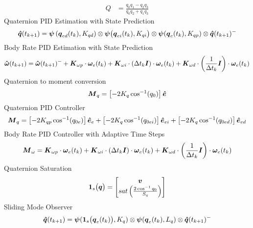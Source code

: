 \begin{nomenclature}
\begin{equation}
\begin{aligned}
    Q &= \frac{q_{0}q_{1} - q_{2}q_{3}}{q_{0}q_{2} + q_{1}q_{3}}
  \end{aligned}
\end{equation}
Quaternion PID Estimation with State Prediction
\begin{equation}
  \boldsymbol{\hat{q}}(t_{k+1}) = \boldsymbol{\psi}\left(\boldsymbol{q}_{ed}(t_k), K_{qd}\right) \otimes \boldsymbol{\psi}\big(\boldsymbol{q}_{ei}(t_k), K_{qi}\big) \otimes \boldsymbol{\psi}(\boldsymbol{q}_e(t_{k}), K_{qp})  \otimes \boldsymbol{\hat{q}}(t_{k+1})^-
\end{equation}
Body Rate PID Estimation with State Prediction
\begin{equation}
  \boldsymbol{\hat{\omega}}(t_{k+1}) = \boldsymbol{\hat{\omega}}(t_{k+1})^- + \boldsymbol{K}_{\omega p} \cdot \boldsymbol{\omega}_e(t_{k}) + \boldsymbol{K}_{\omega i} \cdot (\Delta t_k \boldsymbol{I})\cdot \boldsymbol{\omega}_e(t_{k}) + \boldsymbol{K}_{\omega d} \cdot \left(\frac{1}{\Delta t_k} \boldsymbol{I}\right) \cdot \boldsymbol{\omega}_e(t_{k})
\end{equation}
Quaternion to moment conversion\\
\begin{equation} \boldsymbol{M}_{q} = \left[-2 K_{q} \cos^{-1} (q_{0}) \right] \boldsymbol{\hat{e}} \end{equation}
Quaternion PID Controller \\
\begin{equation} \boldsymbol{M}_{q} = \left[-2 K_{qp} \cos^{-1} (q_{0e}) \right] \boldsymbol{\hat{e}}_e + \left[-2 K_{q} \cos^{-1} (q_{0ei}) \right] \boldsymbol{\hat{e}}_{ei} + \left[-2 K_{q} \cos^{-1} (q_{0ed}) \right] \boldsymbol{\hat{e}}_{ed} \end{equation}
Body Rate PID Controller with Adaptive Time Steps\\
\begin{equation}\boldsymbol{M}_{\omega} = \boldsymbol{K}_{\omega p} \cdot \boldsymbol{\omega}_e(t_{k}) + \boldsymbol{K}_{\omega i} \cdot (\Delta t_k \boldsymbol{I})\cdot \boldsymbol{\omega}_e(t_{k}) + \boldsymbol{K}_{\omega d} \cdot \left(\frac{1}{\Delta t_k} \boldsymbol{I}\right) \cdot \boldsymbol{\omega}_e(t_{k})\end{equation}
Quaternion Saturation
\begin{equation} \boldsymbol{1}_s\big(\boldsymbol{q} \big) = \begin{bmatrix} \boldsymbol{v} \\ sat\left( \frac{2\cos^{-1} q_{0} }{S_{q}} \right) \end{bmatrix} \end{equation}
Sliding Mode Observer \\
\begin{subequations}
  \begin{align}
    \bs{\hat{q}}(t_{k+1}) &= \bs{\psi} (\bs{1}_s\big(\bs{q}_{e}(t_k)\big), K_q) \otimes \bs{\psi}(\bs{q}_e(t_{k}), L_{q})  \otimes \bs{\hat{q}}(t_{k+1})^- \\

\end{align}
\end{subequations}
\end{nomenclature}
